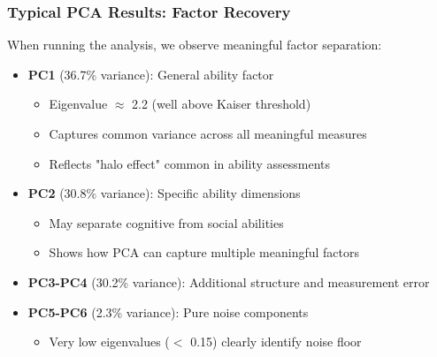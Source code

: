 \documentclass[aspectratio=169]{beamer}
\begin{document}
\begin{frame}
    \frametitle{Typical PCA Results: Factor Recovery}
    When running the analysis, we observe meaningful factor separation:
    \begin{itemize}
        \item \textbf{PC1} (36.7\% variance): General ability factor \pause
              \begin{itemize}
                  \item Eigenvalue $\approx$ 2.2 (well above Kaiser threshold) \pause
                  \item Captures common variance across all meaningful measures \pause
                  \item Reflects "halo effect" common in ability assessments \pause
              \end{itemize}
        \item \textbf{PC2} (30.8\% variance): Specific ability dimensions \pause
              \begin{itemize}
                  \item May separate cognitive from social abilities \pause
                  \item Shows how PCA can capture multiple meaningful factors \pause
              \end{itemize}
        \item \textbf{PC3-PC4} (30.2\% variance): Additional structure and measurement error \pause
        \item \textbf{PC5-PC6} (2.3\% variance): Pure noise components \pause
              \begin{itemize}
                  \item Very low eigenvalues ($<$ 0.15) clearly identify noise floor \pause
              \end{itemize}
    \end{itemize}
\end{frame}
\end{document}
